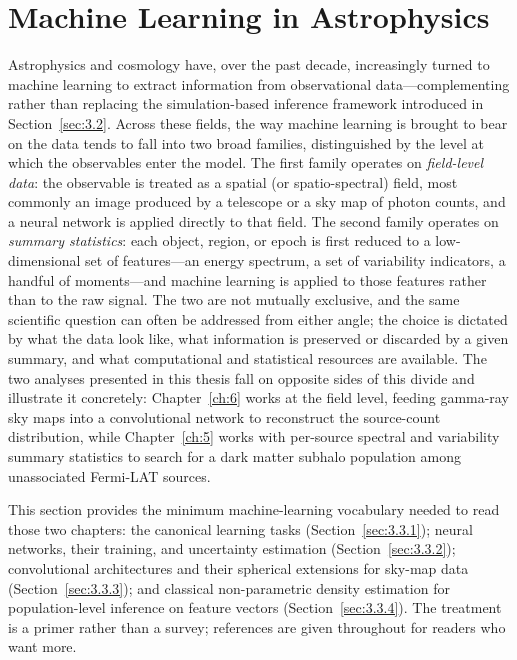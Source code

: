 \section{Machine Learning in Astrophysics}
\label{sec:3.3}
Astrophysics and cosmology have, over the past decade, increasingly turned to machine learning to extract information from observational data---complementing rather than replacing the simulation-based inference framework introduced in Section~\ref{sec:3.2}.
Across these fields, the way machine learning is brought to bear on the data tends to fall into two broad families, distinguished by the level at which the observables enter the model.
The first family operates on \emph{field-level data}: the observable is treated as a spatial (or spatio-spectral) field, most commonly an image produced by a telescope or a sky map of photon counts, and a neural network is applied directly to that field.
The second family operates on \emph{summary statistics}: each object, region, or epoch is first reduced to a low-dimensional set of features---an energy spectrum, a set of variability indicators, a handful of moments---and machine learning is applied to those features rather than to the raw signal.
The two are not mutually exclusive, and the same scientific question can often be addressed from either angle; the choice is dictated by what the data look like, what information is preserved or discarded by a given summary, and what computational and statistical resources are available.
The two analyses presented in this thesis fall on opposite sides of this divide and illustrate it concretely: Chapter~\ref{ch:6} works at the field level, feeding gamma-ray sky maps into a convolutional network to reconstruct the source-count distribution, while Chapter~\ref{ch:5} works with per-source spectral and variability summary statistics to search for a dark matter subhalo population among unassociated Fermi-LAT sources.

This section provides the minimum machine-learning vocabulary needed to read those two chapters: the canonical learning tasks (Section~\ref{sec:3.3.1}); neural networks, their training, and uncertainty estimation (Section~\ref{sec:3.3.2}); convolutional architectures and their spherical extensions for sky-map data (Section~\ref{sec:3.3.3}); and classical non-parametric density estimation for population-level inference on feature vectors (Section~\ref{sec:3.3.4}).
The treatment is a primer rather than a survey; references are given throughout for readers who want more.

